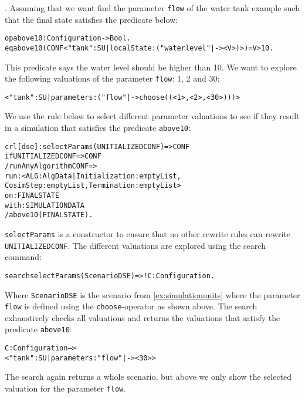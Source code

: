 \begin{example}\label{ex:dse}.
  Assuming that we want find the parameter \texttt{flow} of the water tank example such that the final state satisfies the predicate below:

  \scriptsize
  \begin{alltt}
op above10 : Configuration -> Bool .
eq above10(CONF < "tank" : SU | localState : ( "waterlevel" |-> < V >) >) = V > 10 .  
  \end{alltt}
  \normalsize

This predicate says the water level should be higher than 10.
We want to explore the following valuations of the parameter \texttt{flow}: 1, 2 and 30:

\small
\begin{alltt}
< "tank" : SU | parameters : ("flow" |-> choose((< 1 >,< 2 >,< 30 >))) >
\end{alltt}
\normalsize

We use the rule below to select different parameter valuations to see if they result in a simulation that satisfies the predicate \texttt{above10}:

\small
\begin{alltt}
  crl [dse] : selectParams(UNITIALIZEDCONF) => CONF 
  if UNITIALIZEDCONF => CONF
  / runAnyAlgorithm CONF => 
      run: < ALG : AlgData | Initialization : emptyList, 
      CosimStep : emptyList, Termination : emptyList > 
      on: FINALSTATE
      with: SIMULATIONDATA
  / above10(FINALSTATE) .
\end{alltt}
\normalsize

\texttt{selectParams} is a constructor to ensure that no other rewrite rules can rewrite \texttt{UNITIALIZEDCONF}.
The different valuations are explored using the search command:

\small
\begin{alltt}
  search selectParams(ScenarioDSE)  =>! C:Configuration .
\end{alltt}
\normalsize

Where \texttt{ScenarioDSE} is the scenario from \cref{ex:simulationunits} where the parameter \texttt{flow} is defined using the \texttt{choose}-operator as shown above.
The search exhaustively checks all valuations and returns the valuations that satisfy the predicate \texttt{above10}:

\small
\begin{alltt}
C:Configuration --> 
  < "tank" : SU | parameters : "flow" |-> < 30 > >
\end{alltt}
\normalsize

The search again returns a whole scenario, but above we only show the selected valuation for the parameter \texttt{flow}.
\end{example}

